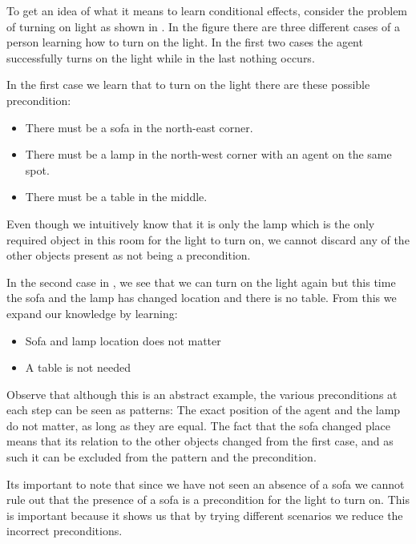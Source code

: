 \documentclass[\master/Master.tex]{subfiles}
\begin{document}
\begin{example}\label{ex:ca:light-on} To get an idea of what it means to learn conditional effects,
consider the problem of turning on light as shown in .
In the figure there are three different cases of a person learning how to turn on the
light. In the first two cases the agent successfully turns on the light while in the last nothing occurs.

In the first case we learn that to turn on the light there are these possible precondition:
\begin{itemize}
	\item There must be a sofa in the north-east corner.
	\item There must be a lamp in the north-west corner with an agent on the same spot.
	\item There must be a table in the middle.
\end{itemize}
Even though we intuitively know that it is only the lamp which is the only required object in this room for the light to turn on, we cannot discard any of the other objects present as not being a precondition.


	In the second case in ,
	we see that we can turn on the light again but this time the sofa and the lamp has changed location and
	there is no table. From this we expand our knowledge by learning:
	\begin{itemize}
		\item Sofa and lamp location does not matter
		\item A table is not needed
	\end{itemize}
    
    Observe that although this is an abstract example, the various preconditions at each step can be seen as patterns: The exact position of the agent and the lamp do not matter, as long as they are equal. The fact that the sofa changed place means that its relation to the other objects changed from the first case, and as such it can be excluded from the pattern and the precondition.

	Its important to note that since we have not seen an absence of a sofa we cannot rule out that the presence of a sofa is a precondition for the light to turn on. This is important because it shows us that by trying different scenarios we reduce the incorrect preconditions. 

\end{example}
\end{document}
